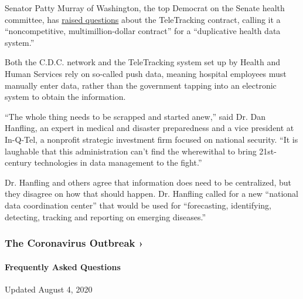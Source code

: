 Senator Patty Murray of Washington, the top Democrat on the Senate
health committee, has
\href{https://www.help.senate.gov/ranking/newsroom/press/murray-demands-answers-regarding-non-competitive-multimillion-dollar-contract-for-duplicative-health-data-system-}{raised
questions} about the TeleTracking contract, calling it a
``noncompetitive, multimillion-dollar contract'' for a ``duplicative
health data system.''

Both the C.D.C. network and the TeleTracking system set up by Health and
Human Services rely on so-called push data, meaning hospital employees
must manually enter data, rather than the government tapping into an
electronic system to obtain the information.

``The whole thing needs to be scrapped and started anew,'' said Dr. Dan
Hanfling, an expert in medical and disaster preparedness and a vice
president at In-Q-Tel, a nonprofit strategic investment firm focused on
national security. ``It is laughable that this administration can't find
the wherewithal to bring 21st-century technologies in data management to
the fight.''

Dr. Hanfling and others agree that information does need to be
centralized, but they disagree on how that should happen. Dr. Hanfling
called for a new ``national data coordination center'' that would be
used for ``forecasting, identifying, detecting, tracking and reporting
on emerging diseases.''

\href{https://www.nytimes3xbfgragh.onion/news-event/coronavirus?action=click\&pgtype=Article\&state=default\&region=MAIN_CONTENT_3\&context=storylines_faq}{}

\hypertarget{the-coronavirus-outbreak-}{%
\subsubsection{The Coronavirus Outbreak
›}\label{the-coronavirus-outbreak-}}

\hypertarget{frequently-asked-questions}{%
\paragraph{Frequently Asked
Questions}\label{frequently-asked-questions}}

Updated August 4, 2020

